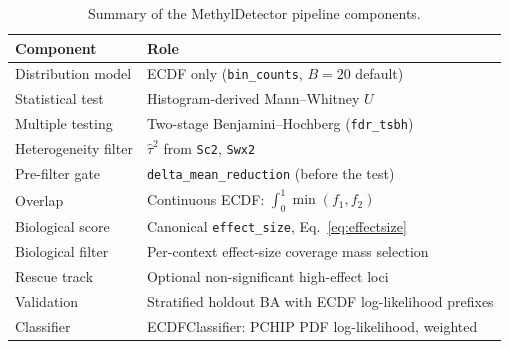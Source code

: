 \documentclass[11pt]{article}
\begin{document}
\begin{table}[h]
\centering
\begin{tabular}{@{}ll@{}}
\toprule
Component & Role \\
\midrule
Distribution model    & ECDF only (\texttt{bin\_counts}, \(B=20\) default) \\
Statistical test      & Histogram-derived Mann--Whitney $U$ \\
Multiple testing      & Two-stage Benjamini--Hochberg (\texttt{fdr\_tsbh}) \\
Heterogeneity filter  & \(\hat\tau^2\) from \texttt{Sc2}, \texttt{Swx2} \\
Pre-filter gate       & \texttt{delta\_mean\_reduction} (before the test) \\
Overlap               & Continuous ECDF: \(\int_0^1\min(f_1,f_2)\) \\
Biological score      & Canonical \texttt{effect\_size}, Eq.~\eqref{eq:effectsize} \\
Biological filter     & Per-context effect-size coverage mass selection \\
Rescue track          & Optional non-significant high-effect loci \\
Validation            & Stratified holdout BA with ECDF log-likelihood prefixes \\
Classifier            & ECDFClassifier: PCHIP PDF log-likelihood, weighted \\
\bottomrule
\end{tabular}
\caption{Summary of the MethylDetector pipeline components.}
\end{table}
\end{document}
